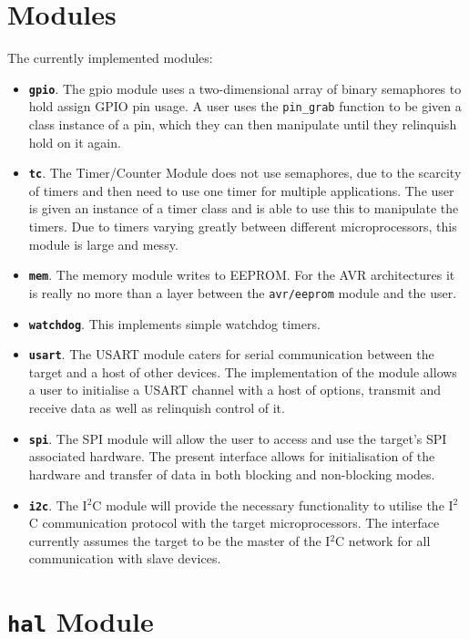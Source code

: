 \documentclass[a4paper, oneside, 11pt, titlepage, onecolumn, openright]{report}
\begin{document}
\section{Modules}
			\label{s:HALModules}
			The currently implemented modules:
			
\begin{itemize}
\item \textbf{\texttt{gpio}}. The gpio module uses a two-dimensional array of binary semaphores to hold assign GPIO pin usage. A user uses the \texttt{pin\_grab} function to be given a class instance of a pin, which they can then manipulate until they relinquish hold on it again. 
\item \textbf{\texttt{tc}}. The Timer/Counter Module does not use semaphores, due to the scarcity of timers and then need to use one timer for multiple applications. The user is given an instance of a timer class and is able to use this to manipulate the timers. Due to timers varying greatly between different microprocessors, this module is large and messy.
\item \textbf{\texttt{mem}}. The memory module writes to EEPROM. For the AVR architectures it is really no more than a layer between the \texttt{avr/eeprom} module and the user.
\item \textbf{\texttt{watchdog}}. This implements simple watchdog timers.
\item \textbf{\texttt{usart}}. The USART module caters for serial communication between the target and a host of other devices. The implementation of the module allows a user to initialise a USART channel with a host of options, transmit and receive data as well as relinquish control of it.
\item \textbf{\texttt{spi}}. The SPI module will allow the user to access and use the target's SPI associated hardware. The present interface allows for initialisation of the hardware and transfer of data in both blocking and non-blocking modes.
\item \textbf{\texttt{i2c}}. The I$^{2}$C module will provide the necessary functionality to utilise the I$^{2}$C communication protocol with the target microprocessors. The interface currently assumes the target to be the master of the I$^{2}$C network for all communication with slave devices.
\end{itemize}

\section{\textbf{\texttt{hal}} Module}
			\label{s:HALhalModule}
			
\end{document}
